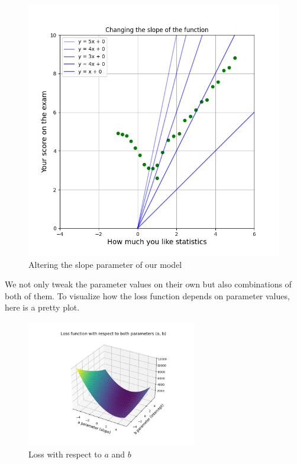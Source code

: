 \documentclass{article}
\begin{document}
\begin{figure}[h]
\begin{minipage}{0.4\textwidth}
        \includegraphics[width=\linewidth]{../images/myplot3.png}
        \caption{Altering the slope parameter of our model}
    \end{minipage}
\end{figure}

We not only tweak the parameter values on their own but also combinations of both of them. To visualize how the loss function depends on parameter values, here is a pretty plot.

\begin{figure}[h]
    \centering
    \includegraphics[width=0.66\textwidth]{../images/myplot4.png}
    \caption{Loss with respect to $a$ and $b$}
    \label{fig:loss_3d}
\end{figure}
\end{document}
